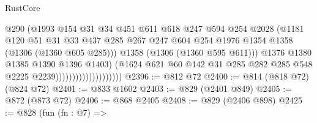 \begin{lexlean}{RustCore}
\begin{coremodule}
                                            @290
                                            (@1993
                                              @154
                                              @31
                                              @34
                                              @451
                                              @611
                                              @618
                                              @247
                                              @594
                                              @254
                                              @2028
                                              (@1181
                                                @120
                                                @51
                                                @31
                                                @33
                                                @437
                                                @285
                                                @267
                                                @247
                                                @604
                                                @254
                                                @1976
                                                @1354
                                                @1358
                                                (@1306 (@1360 @605 @285)))
                                              @1358
                                              (@1306 (@1360 @595 @611)))
                                            @1376
                                            @1380
                                            @1385
                                            @1390
                                            @1396
                                            @1403)
                                          (@1624
                                            @621
                                            @60
                                            @142
                                            @31
                                            @285
                                            @282
                                            @285
                                            @548
                                            @2225
                                            @2239))))))))))))))))))))
@2396 := @812 @72
@2400 := @814 (@818 @72) (@824 @72)
@2401 := @833 @1602
@2403 := @829 (@2401 @849)
@2405 := @872 (@873 @72)
@2406 := @868 @2405
@2408 := @829 (@2406 @898)
@2425 := @828
    (fun (fn : @7) =>

\end{coremodule}
\end{lexlean}
